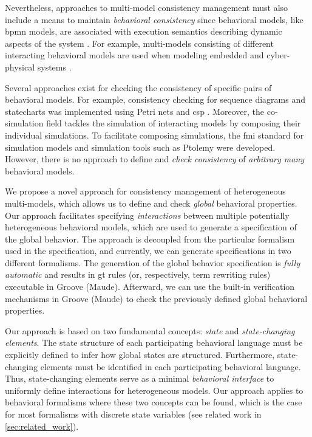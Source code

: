 \documentclass{jot}
\begin{document}
Nevertheless, approaches to multi-model consistency management must also include a means to maintain \textit{behavioral consistency} since behavioral models, like \gls*{bpmn} models, are associated with execution semantics describing dynamic aspects of the system \cite{objectmanagementgroupBusinessProcessModel2013}.
For example, multi-models consisting of different interacting behavioral models are used when modeling embedded and cyber-physical systems \cite{varalarsenBehavioralCoordinationOperator2015}.

Several approaches exist for checking the consistency of specific pairs of behavioral models.
For example, consistency checking for sequence diagrams and statecharts was implemented using Petri nets \cite{yaoConsistencyCheckingUML2006} and \gls*{csp} \cite{kusterExplicitBehavioralConsistency2003}.
Moreover, the co-simulation field tackles the simulation of interacting models by composing their individual simulations.
To facilitate composing simulations, the \gls*{fmi} standard for simulation models and simulation tools such as Ptolemy \cite{ekerTamingHeterogeneityPtolemy2003} were developed.
However, there is no approach to define and \textit{check consistency} of \textit{arbitrary many} behavioral models.

We propose a novel approach for consistency management of heterogeneous multi-models, which allows us to define and check \textit{global} behavioral properties.
Our approach facilitates specifying \textit{interactions} between multiple potentially heterogeneous behavioral models, which are used to generate a specification of the global behavior.
The approach is decoupled from the particular formalism used in the specification, and currently, we can generate specifications in two different formalisms.
The generation of the global behavior specification is \textit{fully automatic} and results in \gls*{gt} rules (or, respectively, term rewriting rules) executable in Groove (Maude).
Afterward, we can use the built-in verification mechanisms in Groove (Maude) to check the previously defined global behavioral properties.

Our approach is based on two fundamental concepts: \textit{state} and \textit{state-changing elements}.
The state structure of each participating behavioral language must be explicitly defined to infer how global states are structured.
Furthermore, state-changing elements must be identified in each participating behavioral language.
Thus, state-changing elements serve as a minimal \textit{behavioral interface} to uniformly define interactions for heterogeneous models.
Our approach applies to behavioral formalisms where these two concepts can be found, which is the case for most formalisms with discrete state variables (see related work in \cref{sec:related_work}).
\end{document}
